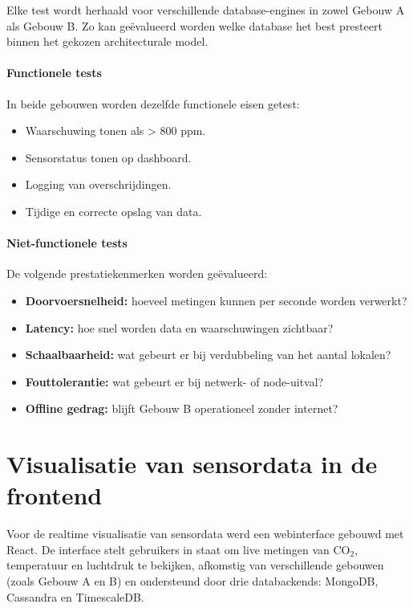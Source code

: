 Elke test wordt herhaald voor verschillende database-engines in zowel Gebouw A als Gebouw B. Zo kan geëvalueerd worden welke database het best presteert binnen het gekozen architecturale model.

\paragraph{Functionele tests}
In beide gebouwen worden dezelfde functionele eisen getest:
\begin{itemize}
    \item Waarschuwing tonen als  > 800 ppm.
    \item Sensorstatus tonen op dashboard.
    \item Logging van overschrijdingen.
    \item Tijdige en correcte opslag van data.
\end{itemize}

\paragraph{Niet-functionele tests}
De volgende prestatiekenmerken worden geëvalueerd:
\begin{itemize}
    \item \textbf{Doorvoersnelheid:} hoeveel metingen kunnen per seconde worden verwerkt?
    \item \textbf{Latency:} hoe snel worden data en waarschuwingen zichtbaar?
    \item \textbf{Schaalbaarheid:} wat gebeurt er bij verdubbeling van het aantal lokalen?
    \item \textbf{Fouttolerantie:} wat gebeurt er bij netwerk- of node-uitval?
    \item \textbf{Offline gedrag:} blijft Gebouw B operationeel zonder internet?
\end{itemize}

\section{Visualisatie van sensordata in de frontend}

Voor de realtime visualisatie van sensordata werd een webinterface gebouwd met React.
 De interface stelt gebruikers in staat om live metingen van CO$_2$, temperatuur en luchtdruk te bekijken, afkomstig van verschillende gebouwen (zoals Gebouw A en B) en ondersteund door drie databackends: MongoDB, Cassandra en TimescaleDB.

